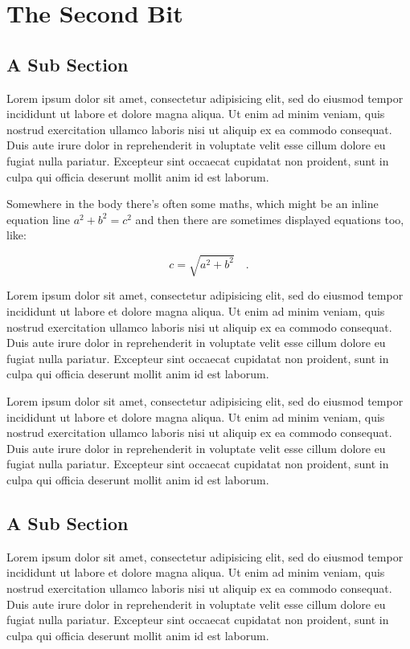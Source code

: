 \documentclass[a0,landscape]{a0poster}
\begin{document}
\section{The Second Bit}

\subsection{A Sub Section}

Lorem ipsum dolor sit amet, consectetur adipisicing elit, sed do eiusmod
tempor incididunt ut labore et dolore magna aliqua. Ut enim ad minim
veniam, quis nostrud exercitation ullamco laboris nisi ut aliquip ex ea
commodo consequat. Duis aute irure dolor in reprehenderit in voluptate
velit esse cillum dolore eu fugiat nulla pariatur. Excepteur sint occaecat
cupidatat non proident, sunt in culpa qui officia deserunt mollit anim
id est laborum.

Somewhere in the body there's often some maths, which might be an inline equation
line $a^2+b^2=c^2$ and then there are sometimes displayed equations too, like:

\begin{equation}
c = \sqrt{a^2+b^2}\quad.
\end{equation}

Lorem ipsum dolor sit amet, consectetur adipisicing elit, sed do
eiusmod tempor incididunt ut labore et dolore magna aliqua. Ut enim
ad minim veniam, quis nostrud exercitation ullamco laboris nisi ut
aliquip ex ea commodo consequat. Duis aute irure dolor in
reprehenderit in voluptate velit esse cillum dolore eu fugiat nulla
pariatur. Excepteur sint occaecat cupidatat non proident, sunt in
culpa qui officia deserunt mollit anim id est laborum.

Lorem ipsum dolor sit amet, consectetur adipisicing elit, sed do
eiusmod tempor incididunt ut labore et dolore magna aliqua. Ut enim
ad minim veniam, quis nostrud exercitation ullamco laboris nisi ut
aliquip ex ea commodo consequat. Duis aute irure dolor in
reprehenderit in voluptate velit esse cillum dolore eu fugiat nulla
pariatur. Excepteur sint occaecat cupidatat non proident, sunt in
culpa qui officia deserunt mollit anim id est laborum.

\subsection{A Sub Section}

Lorem ipsum dolor sit amet, consectetur adipisicing elit, sed do eiusmod
tempor incididunt ut labore et dolore magna aliqua. Ut enim ad minim
veniam, quis nostrud exercitation ullamco laboris nisi ut aliquip ex ea
commodo consequat. Duis aute irure dolor in reprehenderit in voluptate
velit esse cillum dolore eu fugiat nulla pariatur. Excepteur sint occaecat
cupidatat non proident, sunt in culpa qui officia deserunt mollit anim
id est laborum.
\end{document}
